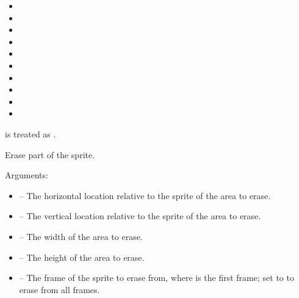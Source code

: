 \documentclass[letterpaper,10pt,english]{sphinxmanual}
\begin{document}
\begin{fulllineitems}
\begin{itemize}
\begin{itemize}
\item {} 

\item {} 

\item {} 

\item {} 

\item {} 

\item {} 

\item {} 

\item {} 

\item {} 

\item {} 

\end{itemize}

 is treated as .

\end{itemize}

\end{fulllineitems}


\begin{fulllineitems}
\label{gfx:sge.gfx.Sprite.draw_erase}
Erase part of the sprite.

Arguments:
\begin{itemize}
\item {} 
 -- The horizontal location relative to the sprite of the
area to erase.

\item {} 
 -- The vertical location relative to the sprite of the
area to erase.

\item {} 
 -- The width of the area to erase.

\item {} 
 -- The height of the area to erase.

\item {} 
 -- The frame of the sprite to erase from, where
 is the first frame; set to  to erase from
all frames.

\end{itemize}

\end{fulllineitems}
\end{document}
